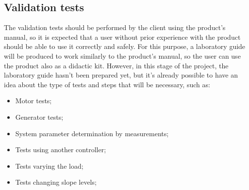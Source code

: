 \subsection{Validation tests}
\label{sec:orgff1a37d}
The validation tests should be performed by the client using the product’s
manual, so it is expected that a user without prior experience with the product
should be able to use it correctly and safely. 
For this purpose, a laboratory guide will be produced to work similarly to the
product’s manual, so the user can use the product also as a didactic kit. However, in this stage of the project, the laboratory guide hasn’t been prepared yet, but it’s already possible to have an idea about the type of tests and steps that will be necessary, such as:
\begin{itemize}
\item Motor tests;
\item Generator tests;
\item System parameter determination by measurements;
\item Tests using another controller;
\item Tests varying the load;
\item Tests changing slope levels;
\end{itemize}
